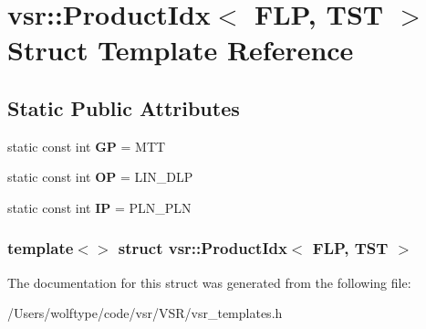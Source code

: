 \hypertarget{structvsr_1_1_product_idx_3_01_f_l_p_00_01_t_s_t_01_4}{\section{vsr\-:\-:Product\-Idx$<$ F\-L\-P, T\-S\-T $>$ Struct Template Reference}
\label{structvsr_1_1_product_idx_3_01_f_l_p_00_01_t_s_t_01_4}
}
\subsection*{Static Public Attributes}
\begin{DoxyCompactItemize}
\item 
\hypertarget{structvsr_1_1_product_idx_3_01_f_l_p_00_01_t_s_t_01_4_a75d7f5bd1f269a0c381224deeec10ba5}{static const int {\bfseries G\-P} = M\-T\-T}\label{structvsr_1_1_product_idx_3_01_f_l_p_00_01_t_s_t_01_4_a75d7f5bd1f269a0c381224deeec10ba5}

\item 
\hypertarget{structvsr_1_1_product_idx_3_01_f_l_p_00_01_t_s_t_01_4_a0cbeef7afe02522410dd2baf27994e25}{static const int {\bfseries O\-P} = L\-I\-N\-\_\-\-D\-L\-P}\label{structvsr_1_1_product_idx_3_01_f_l_p_00_01_t_s_t_01_4_a0cbeef7afe02522410dd2baf27994e25}

\item 
\hypertarget{structvsr_1_1_product_idx_3_01_f_l_p_00_01_t_s_t_01_4_a8a2abab3e767c89fe85aa5b52f1ec8c1}{static const int {\bfseries I\-P} = P\-L\-N\-\_\-\-P\-L\-N}\label{structvsr_1_1_product_idx_3_01_f_l_p_00_01_t_s_t_01_4_a8a2abab3e767c89fe85aa5b52f1ec8c1}

\end{DoxyCompactItemize}
\subsubsection*{template$<$$>$ struct vsr\-::\-Product\-Idx$<$ F\-L\-P, T\-S\-T $>$}



The documentation for this struct was generated from the following file\-:\begin{DoxyCompactItemize}
\item 
/\-Users/wolftype/code/vsr/\-V\-S\-R/vsr\-\_\-templates.\-h\end{DoxyCompactItemize}
